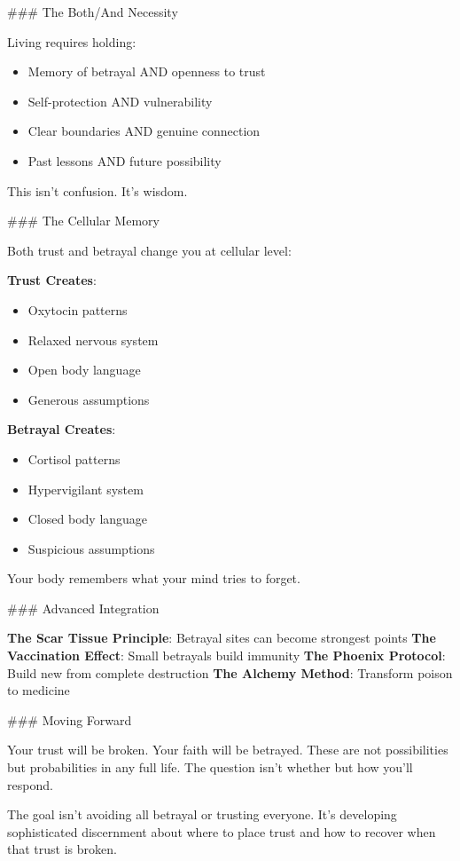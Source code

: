 \documentclass[12pt]{book}
\begin{document}
\#\#\# The Both/And Necessity

Living requires holding:
\begin{itemize}
\item Memory of betrayal AND openness to trust
\item Self-protection AND vulnerability
\item Clear boundaries AND genuine connection
\item Past lessons AND future possibility

\end{itemize}
This isn't confusion. It's wisdom.

\#\#\# The Cellular Memory

Both trust and betrayal change you at cellular level:

\textbf{Trust Creates}:
\begin{itemize}
\item Oxytocin patterns
\item Relaxed nervous system
\item Open body language
\item Generous assumptions

\end{itemize}
\textbf{Betrayal Creates}:
\begin{itemize}
\item Cortisol patterns
\item Hypervigilant system
\item Closed body language
\item Suspicious assumptions

\end{itemize}
Your body remembers what your mind tries to forget.

\#\#\# Advanced Integration

\textbf{The Scar Tissue Principle}: Betrayal sites can become strongest points
\textbf{The Vaccination Effect}: Small betrayals build immunity
\textbf{The Phoenix Protocol}: Build new from complete destruction
\textbf{The Alchemy Method}: Transform poison to medicine

\#\#\# Moving Forward

Your trust will be broken. Your faith will be betrayed. These are not possibilities but probabilities in any full life. The question isn't whether but how you'll respond.

The goal isn't avoiding all betrayal or trusting everyone. It's developing sophisticated discernment about where to place trust and how to recover when that trust is broken.
\end{document}

